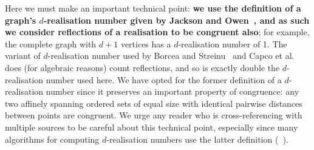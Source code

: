 \documentclass[ALCO]{cedram}
\begin{document}
Here we must make an important technical point:
\textbf{we use the definition of a graph's $d$-realisation number given by Jackson and Owen~\cite{JacksonOwen}, and as such we consider reflections of a realisation to be congruent also};
for example, the complete graph with $d+1$ vertices has a $d$-realisation number of 1.
The variant of $d$-realisation number used by Borcea and Streinu~\cite{BorceaStreinu} and Capco et al.~\cite{PlaneCount} does (for algebraic reasons) count reflections, and so is exactly double the $d$-realisation number used here.
We have opted for the former definition of a $d$-realisation number since it preserves an important property of congruence:
any two affinely spanning ordered sets of equal size with identical pairwise distances between points are congruent.
We urge any reader who is cross-referencing with multiple sources to be careful about this technical point,
especially since many algorithms for computing $d$-realisation numbers use the latter definition (\eg~\cite{PlaneCount,SphereCount}).
\end{document}
